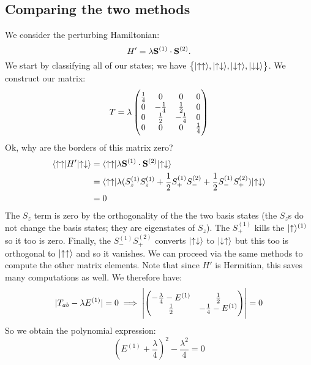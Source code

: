 \subsection{Comparing the two methods}
We consider the perturbing Hamiltonian:
\begin{equation}
    H' = \lambda\mathbf{S}^{(1)} \cdot \mathbf{S}^{(2)}.
\end{equation}
We start by classifying all of our states; we have $\set{\lvert \uparrow\uparrow \rangle, \lvert \uparrow\downarrow \rangle, \lvert \downarrow\uparrow \rangle, \lvert \downarrow\downarrow \rangle}$. We construct our matrix:
\begin{equation}
    T = \lambda\begin{pmatrix}\frac{1}{4}& 0&0& 0\\ 0& -\frac{1}{4}& \frac{1}{2}& 0\\ 0& \frac{1}{2}& -\frac{1}{4}& 0\\0 & 0& 0& \frac{1}{4}\end{pmatrix}
\end{equation}
Ok, why are the borders of this matrix zero?
\begin{equation}
    \begin{split}
        \langle \uparrow\uparrow \rvert H'\lvert \uparrow\downarrow \rangle &= \langle \uparrow\uparrow \rvert \lambda\mathbf{S}^{(1)} \cdot \mathbf{S}^{(2)}\lvert \uparrow\downarrow \rangle
        \\ &= \langle \uparrow\uparrow \rvert \lambda(S_z^{(1)}S_z^{(1)} + \frac{1}{2}S_+^{(1)}S_-^{(2)} + \frac{1}{2}S_-^{(1)}S_+^{(2)})\lvert \uparrow\downarrow \rangle
        \\ &= 0
    \end{split}
\end{equation}
The $S_z$ term is zero by the orthogonality of the the two basis states (the $S_z$s do not change the basis states; they are eigenstates of $S_z$). The $S_+^{(1)}$ kills the $\lvert \uparrow \rangle^{(1)}$ so it too is zero. Finally, the $S_-^{(1)}S_+^{(2)}$ converts $\lvert \uparrow\downarrow \rangle$ to $\lvert \downarrow\uparrow \rangle$ but this too is orthogonal to $\lvert \uparrow\uparrow \rangle$ and so it vanishes. We can proceed via the same methods to compute the other matrix elements. Note that since $H'$ is Hermitian, this saves many computations as well. We therefore have:
\begin{equation}
    \lvert T_{ab} - \lambda E^{(1)} \rvert = 0 \implies \left|\begin{pmatrix}-\frac{\lambda}{4} - E^{(1)} & \frac{1}{2} \\ \frac{1}{2} & -\frac{1}{4} - E^{(1)}\end{pmatrix}  \right| = 0
\end{equation}
So we obtain the polynomial expression:
\begin{equation}
    \left(E^{(1)} + \frac{\lambda}{4}\right)^2 - \frac{\lambda^2}{4} = 0
\end{equation}

